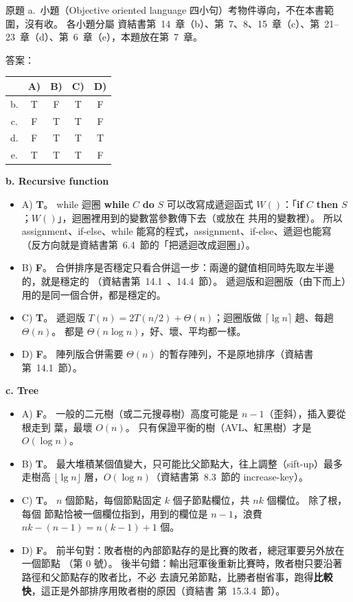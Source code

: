 \begin{pastsoln}
原題 a.\ 小題（Objective oriented language 四小句）考物件導向，不在本書範圍，沒有收。 各小題分屬
資結書第~14~章（b）、第~7、8、15~章（c）、第~21--23~章（d）、第~6~章（e），本題放在第~7~章。

答案：
\begin{center}
\begin{tabular}{ccccc}
\toprule
 & A) & B) & C) & D) \\
\midrule
b. & T & F & T & F \\
c. & F & T & T & F \\
d. & F & T & T & T \\
e. & T & T & T & F \\
\bottomrule
\end{tabular}
\end{center}

\textbf{b. Recursive function}
\begin{itemize}
\item A) \textbf{T}。 while 迴圈 \textbf{while} $C$ \textbf{do} $S$ 可以改寫成遞迴函式
$W()$：「\textbf{if} $C$ \textbf{then} $S$；$W()$」，迴圈裡用到的變數當參數傳下去（或放在
共用的變數裡）。 所以 assignment、if-else、while 能寫的程式，assignment、if-else、遞迴也能寫
（反方向就是資結書第~6.4~節的「把遞迴改成迴圈」）。
\item B) \textbf{F}。 合併排序是否穩定只看合併這一步：兩邊的鍵值相同時先取左半邊的，就是穩定的
（資結書第~14.1~、14.4~節）。 遞迴版和迴圈版（由下而上）用的是同一個合併，都是穩定的。
\item C) \textbf{T}。 遞迴版 $T(n) = 2T(n/2) + \Theta(n)$；迴圈版做 $\lceil \lg n \rceil$ 趟、每趟
$\Theta(n)$。 都是 $\Theta(n \log n)$，好、壞、平均都一樣。
\item D) \textbf{F}。 陣列版合併需要 $\Theta(n)$ 的暫存陣列，不是原地排序（資結書第~14.1~節）。
\end{itemize}

\textbf{c. Tree}
\begin{itemize}
\item A) \textbf{F}。 一般的二元樹（或二元搜尋樹）高度可能是 $n - 1$（歪斜），插入要從根走到
葉，最壞 $O(n)$。 只有保證平衡的樹（AVL、紅黑樹）才是 $O(\log n)$。
\item B) \textbf{T}。 最大堆積某個值變大，只可能比父節點大，往上調整（sift-up）最多走樹高
$\lfloor \lg n \rfloor$ 層，$O(\log n)$（資結書第~8.3~節的 increase-key）。
\item C) \textbf{T}。 $n$ 個節點，每個節點固定 $k$ 個子節點欄位，共 $nk$ 個欄位。 除了根，每個
節點恰被一個欄位指到，用到的欄位是 $n - 1$，浪費 $nk - (n - 1) = n(k - 1) + 1$ 個。
\item D) \textbf{F}。 前半句對：敗者樹的內部節點存的是比賽的敗者，總冠軍要另外放在一個節點
（第 $0$ 號）。 後半句錯：輸出冠軍後重新比賽時，敗者樹只要沿著路徑和父節點存的敗者比，不必
去讀兄弟節點，比勝者樹省事，跑得\textbf{比較快}，這正是外部排序用敗者樹的原因（資結書
第~15.3.4~節）。
\end{itemize}


\end{pastsoln}
